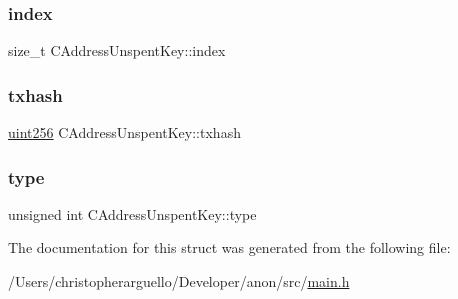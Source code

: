 \subsubsection{\texorpdfstring{index}{index}}
{\footnotesize\ttfamily size\+\_\+t C\+Address\+Unspent\+Key\+::index}

\mbox{\label{struct_c_address_unspent_key_afc2862de02247c4f2538aa8a43c574a4}} 
\subsubsection{\texorpdfstring{txhash}{txhash}}
{\footnotesize\ttfamily \mbox{\hyperlink{classuint256}{uint256}} C\+Address\+Unspent\+Key\+::txhash}

\mbox{\label{struct_c_address_unspent_key_ad4a70a320b93ab806f2605e7dbb75548}} 
\subsubsection{\texorpdfstring{type}{type}}
{\footnotesize\ttfamily unsigned int C\+Address\+Unspent\+Key\+::type}



The documentation for this struct was generated from the following file\+:\begin{DoxyCompactItemize}
\item 
/\+Users/christopherarguello/\+Developer/anon/src/\mbox{\hyperlink{main_8h}{main.\+h}}\end{DoxyCompactItemize}
